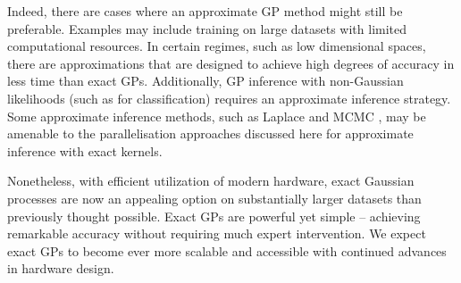 Indeed, there are cases where an approximate GP method might still be preferable.
Examples may include training on large datasets with limited computational resources.
In certain regimes, such as low dimensional spaces, there are
approximations that are designed to achieve high degrees of accuracy in less time than exact GPs.
Additionally, GP inference with non-Gaussian likelihoods (such as for classification)
requires an approximate inference strategy.
Some approximate inference methods, such as Laplace and MCMC \citep{rasmussen2006gaussian, murray2010elliptical},
may be amenable to the parallelisation approaches discussed here for approximate inference with exact kernels.

Nonetheless, with efficient utilization of modern hardware, exact Gaussian processes are now an
appealing option on substantially larger datasets than previously thought possible.
Exact GPs are powerful yet simple -- achieving remarkable accuracy without requiring much expert intervention.
We expect exact GPs to become ever more scalable and accessible with continued advances in hardware design.
